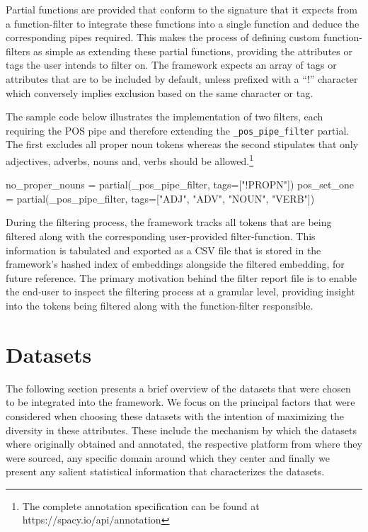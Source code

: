 \documentclass[12pt, a4paper]{report}
\newenvironment{code}
{\footnotesize\verbatim}{\endverbatim\normalfont}
\theoremstyle{definition}
\theoremstyle{definition}%
\theoremstyle{definition}%
\theoremstyle{definition}%
\theoremstyle{definition}%
\theoremstyle{definition}%
\begin{document}
Partial functions are provided that conform to the signature that it expects from a function-filter to integrate these functions into a single function and deduce the corresponding pipes required. This makes the process of defining custom function-filters as simple as extending these partial functions, providing the attributes or tags the user intends to filter on. The framework expects an array of tags or attributes that are to be included by default, unless prefixed with a \enquote{!} character which conversely implies exclusion based on the same character or tag. 

The sample code below illustrates the implementation of two filters, each requiring the POS pipe and therefore extending the \texttt{\_pos\_pipe\_filter} partial. The first excludes all proper noun tokens whereas the second stipulates that only adjectives, adverbs, nouns and, verbs should be allowed.\footnote{The complete annotation specification can be found at https://spacy.io/api/annotation} 

\begin{code}
no_proper_nouns = partial(_pos_pipe_filter, tags=["!PROPN"])
pos_set_one = partial(_pos_pipe_filter, tags=["ADJ", "ADV", "NOUN", "VERB"])
\end{code}

During the filtering process, the framework tracks all tokens that are being filtered along with the corresponding user-provided filter-function. This information is tabulated and exported as a CSV file that is stored in the framework's hashed index of embeddings alongside the filtered embedding, for future reference. The primary motivation behind the filter report file is to enable the end-user to inspect the filtering process at a granular level, providing insight into the tokens being filtered along with the function-filter responsible.

\section{Datasets}
The following section presents a brief overview of the datasets that were chosen to be integrated into the framework. We focus on the principal factors that were considered when choosing these datasets with the intention of maximizing the diversity in these attributes. These include the mechanism by which the datasets where originally obtained and annotated, the respective platform from where they were sourced, any specific domain around which they center and finally we present any salient statistical information that characterizes the datasets.
\end{document}

